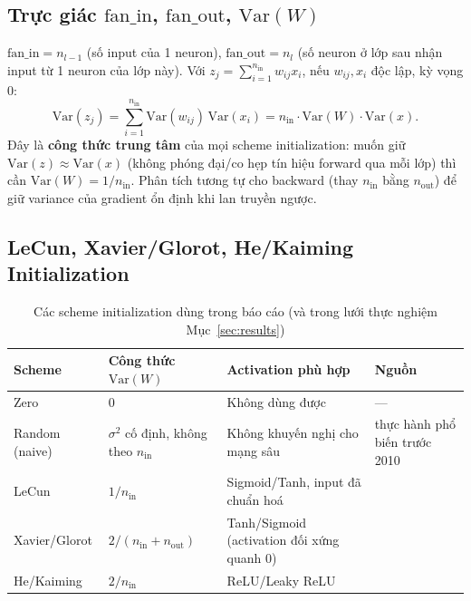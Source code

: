 \documentclass[12pt,a4paper]{article}
\begin{document}
\subsection{Trực giác $\mathrm{fan\_in}$, $\mathrm{fan\_out}$, $\mathrm{Var}(W)$}

$\mathrm{fan\_in}=n_{l-1}$ (số input của 1 neuron), $\mathrm{fan\_out}=n_l$
(số neuron ở lớp sau nhận input từ 1 neuron của lớp này). Với
$z_j=\sum_{i=1}^{n_{\text{in}}} w_{ij}x_i$, nếu $w_{ij},x_i$ độc lập, kỳ
vọng $0$:
$$\mathrm{Var}(z_j) = \sum_{i=1}^{n_{\text{in}}}\mathrm{Var}(w_{ij})\,\mathrm{Var}(x_i) = n_{\text{in}}\cdot\mathrm{Var}(W)\cdot\mathrm{Var}(x).$$
Đây là \textbf{công thức trung tâm} của mọi scheme initialization: muốn
giữ $\mathrm{Var}(z)\approx\mathrm{Var}(x)$ (không phóng đại/co hẹp tín
hiệu forward qua mỗi lớp) thì cần $\mathrm{Var}(W)=1/n_{\text{in}}$. Phân
tích tương tự cho backward (thay $n_{\text{in}}$ bằng $n_{\text{out}}$) để
giữ variance của gradient ổn định khi lan truyền ngược.

\subsection{LeCun, Xavier/Glorot, He/Kaiming Initialization}
\label{sec:schemes}

\begin{table}[H]
\centering
\caption{Các scheme initialization dùng trong báo cáo (và trong lưới thực nghiệm Mục~\ref{sec:results})}
\small
\begin{tabular}{@{}p{2.0cm}p{3.9cm}p{4.4cm}p{3.9cm}@{}}
\toprule
\textbf{Scheme} & \textbf{Công thức} $\mathrm{Var}(W)$ & \textbf{Activation phù hợp} & \textbf{Nguồn} \\
\midrule
Zero & $0$ & Không dùng được & --- \\
Random (naive) & $\sigma^2$ cố định, không theo $n_{\text{in}}$ & Không khuyến nghị cho mạng sâu & thực hành phổ biến trước 2010 \\
LeCun & $1/n_{\text{in}}$ & Sigmoid/Tanh, input đã chuẩn hoá & \citet{lecun1998efficient} \\
Xavier/Glorot & $2/(n_{\text{in}}+n_{\text{out}})$ & Tanh/Sigmoid (activation đối xứng quanh $0$) & \citet{glorot2010understanding} \\
He/Kaiming & $2/n_{\text{in}}$ & ReLU/Leaky ReLU & \citet{he2015delving} \\
\bottomrule
\end{tabular}
\label{tab:schemes}
\end{table}
\end{document}
